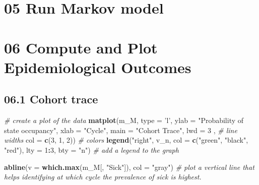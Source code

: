 \documentclass[
]{article}
\newenvironment{Shaded}{\begin{snugshade}}{\end{snugshade}}
\newcommand{\CommentTok}[1]{\textcolor[rgb]{0.56,0.35,0.01}{\textit{#1}}}
\newcommand{\ControlFlowTok}[1]{\textcolor[rgb]{0.13,0.29,0.53}{\textbf{#1}}}
\newcommand{\DataTypeTok}[1]{\textcolor[rgb]{0.13,0.29,0.53}{#1}}
\newcommand{\DecValTok}[1]{\textcolor[rgb]{0.00,0.00,0.81}{#1}}
\newcommand{\KeywordTok}[1]{\textcolor[rgb]{0.13,0.29,0.53}{\textbf{#1}}}
\newcommand{\NormalTok}[1]{#1}
\newcommand{\OperatorTok}[1]{\textcolor[rgb]{0.81,0.36,0.00}{\textbf{#1}}}
\newcommand{\StringTok}[1]{\textcolor[rgb]{0.31,0.60,0.02}{#1}}
\begin{document}
\hypertarget{run-markov-model}{%
\section{05 Run Markov model}\label{run-markov-model}}

\begin{Shaded}
\end{Shaded}

\hypertarget{compute-and-plot-epidemiological-outcomes}{%
\section{06 Compute and Plot Epidemiological
Outcomes}\label{compute-and-plot-epidemiological-outcomes}}

\hypertarget{cohort-trace-1}{%
\subsection{06.1 Cohort trace}\label{cohort-trace-1}}

\begin{Shaded}
\begin{Highlighting}[]
\CommentTok{# create a plot of the data}
\KeywordTok{matplot}\NormalTok{(m_M, }\DataTypeTok{type =} \StringTok{'l'}\NormalTok{, }
        \DataTypeTok{ylab =} \StringTok{"Probability of state occupancy"}\NormalTok{,}
        \DataTypeTok{xlab =} \StringTok{"Cycle"}\NormalTok{,}
        \DataTypeTok{main =} \StringTok{"Cohort Trace"}\NormalTok{, }
        \DataTypeTok{lwd  =} \DecValTok{3}\NormalTok{ , }\CommentTok{# line widths }
        \DataTypeTok{col =} \KeywordTok{c}\NormalTok{(}\DecValTok{3}\NormalTok{, }\DecValTok{1}\NormalTok{, }\DecValTok{2}\NormalTok{))  }\CommentTok{# colors }
\KeywordTok{legend}\NormalTok{(}\StringTok{"right"}\NormalTok{, v_n, }\DataTypeTok{col =} \KeywordTok{c}\NormalTok{(}\StringTok{"green"}\NormalTok{, }\StringTok{"black"}\NormalTok{, }\StringTok{"red"}\NormalTok{), }
       \DataTypeTok{lty =} \DecValTok{1}\OperatorTok{:}\DecValTok{3}\NormalTok{, }\DataTypeTok{bty =} \StringTok{"n"}\NormalTok{)                            }\CommentTok{# add a legend to the graph}

\KeywordTok{abline}\NormalTok{(}\DataTypeTok{v =} \KeywordTok{which.max}\NormalTok{(m_M[, }\StringTok{"Sick"}\NormalTok{]), }\DataTypeTok{col =} \StringTok{"gray"}\NormalTok{) }\CommentTok{# plot a vertical line that helps identifying at which cycle the prevalence of sick is highest.  }
\end{Highlighting}
\end{Shaded}
\end{document}
